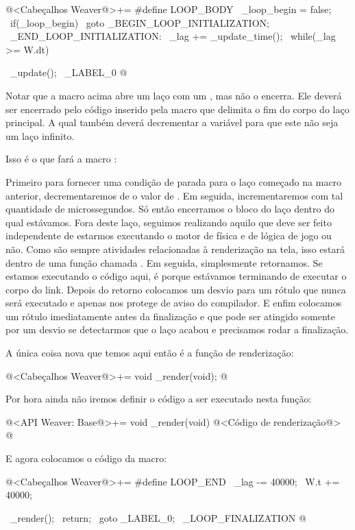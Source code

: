 \iniciocodigo
@<Cabeçalhos Weaver@>+=
#define LOOP_BODY                                            \
  _loop_begin =  false;                                      \
  if(_loop_begin)                                            \
    goto _BEGIN_LOOP_INITIALIZATION;                         \
_END_LOOP_INITIALIZATION:                                    \
  _lag += _update_time();                                    \
  while(_lag >= W.dt){                                       \
    _update();                                               \
_LABEL_0
@
\fimcodigo

Notar que a macro acima abre um laço com um \monoespaco{while}, mas
não o encerra. Ele deverá ser encerrado pelo código inserido pela
macro que delimita o fim do corpo do laço principal. A qual também
deverá decrementar a variável  para que este não
seja um laço infinito.


Isso é o que fará a macro \monoespaco{LOOP\_END}:

Primeiro para fornecer uma condição de parada para o laço começado na
macro anterior, decrementaremos de \monoespaco{\_lag} o valor
de \monoespaco{W.dt}. Em seguida, incrementaremos  com
tal quantidade de microssegundos. Só então encerramos o bloco do laço
dentro do qual estávamos. Fora deste laço, seguimos realizando aquilo
que deve ser feito independente de estarmos executando o motor de
física e de lógica de jogo ou não. Como são sempre atividades
relacionadas à renderização na tela, isso estará dentro de uma função
chamada \monoespaco{\_render}. Em seguida, simplesmente retornamos. Se
estamos executando o código aqui, é porque estávamos terminando de
executar o corpo do link. Depois do retorno colocamos um desvio para
um rótulo que nunca será executado e apenas nos protege de aviso do
compilador. E enfim colocamos um rótulo imediatamente antes da
finalização e que pode ser atingido somente por um desvio se
detectarmos que o laço acabou e precisamos rodar a finalização.

A única coisa nova que temos aqui então é a função de renderização:

\iniciocodigo
@<Cabeçalhos Weaver@>+=
void _render(void);
@
\fimcodigo

Por hora ainda não iremos definir o código a ser executado nesta
função:

\iniciocodigo
@<API Weaver: Base@>+=
void _render(void){
  @<Código de renderização@>
}
@
\fimcodigo

E agora colocamos o código da macro:

\iniciocodigo
@<Cabeçalhos Weaver@>+=
#define LOOP_END                                           \
    _lag -=  40000;                                        \
    W.t +=  40000;                                         \
  }                                                        \
  _render();                                               \
  return;                                                  \
  goto _LABEL_0;                                           \
_LOOP_FINALIZATION
@
\fimcodigo

